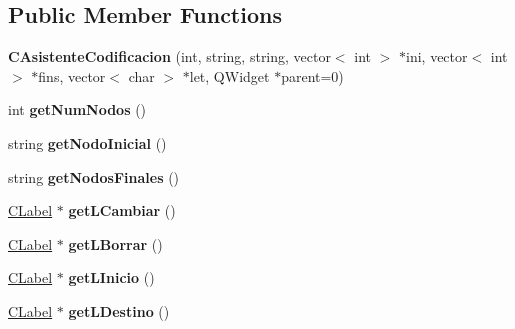 \subsection*{Public Member Functions}
\begin{DoxyCompactItemize}
\item 
{\bfseries C\+Asistente\+Codificacion} (int, string, string, vector$<$ int $>$ $\ast$ini, vector$<$ int $>$ $\ast$fins, vector$<$ char $>$ $\ast$let, Q\+Widget $\ast$parent=0)\hypertarget{classCAsistenteCodificacion_a0c2afc1f5979b36212e847524419e8f9}{}\label{classCAsistenteCodificacion_a0c2afc1f5979b36212e847524419e8f9}

\item 
int {\bfseries get\+Num\+Nodos} ()\hypertarget{classCAsistenteCodificacion_ac65429657b7d034bb8b422ed61b5841c}{}\label{classCAsistenteCodificacion_ac65429657b7d034bb8b422ed61b5841c}

\item 
string {\bfseries get\+Nodo\+Inicial} ()\hypertarget{classCAsistenteCodificacion_a249f33a94fb1ec310f61ed79e756a630}{}\label{classCAsistenteCodificacion_a249f33a94fb1ec310f61ed79e756a630}

\item 
string {\bfseries get\+Nodos\+Finales} ()\hypertarget{classCAsistenteCodificacion_a73fc973e9134649fa288b499a0723192}{}\label{classCAsistenteCodificacion_a73fc973e9134649fa288b499a0723192}

\item 
\hyperlink{classCLabel}{C\+Label} $\ast$ {\bfseries get\+L\+Cambiar} ()\hypertarget{classCAsistenteCodificacion_a3b17ecf32b2b4b5e8d3900cdeaa780ff}{}\label{classCAsistenteCodificacion_a3b17ecf32b2b4b5e8d3900cdeaa780ff}

\item 
\hyperlink{classCLabel}{C\+Label} $\ast$ {\bfseries get\+L\+Borrar} ()\hypertarget{classCAsistenteCodificacion_acee142b78f7055424fb48d6df9dcee98}{}\label{classCAsistenteCodificacion_acee142b78f7055424fb48d6df9dcee98}

\item 
\hyperlink{classCLabel}{C\+Label} $\ast$ {\bfseries get\+L\+Inicio} ()\hypertarget{classCAsistenteCodificacion_a63fcc7bde25a4dc813d81f6591997989}{}\label{classCAsistenteCodificacion_a63fcc7bde25a4dc813d81f6591997989}

\item 
\hyperlink{classCLabel}{C\+Label} $\ast$ {\bfseries get\+L\+Destino} ()\hypertarget{classCAsistenteCodificacion_abb26c06c814cf91080a1b9d83400a77d}{}\label{classCAsistenteCodificacion_abb26c06c814cf91080a1b9d83400a77d}


\end{DoxyCompactItemize}

